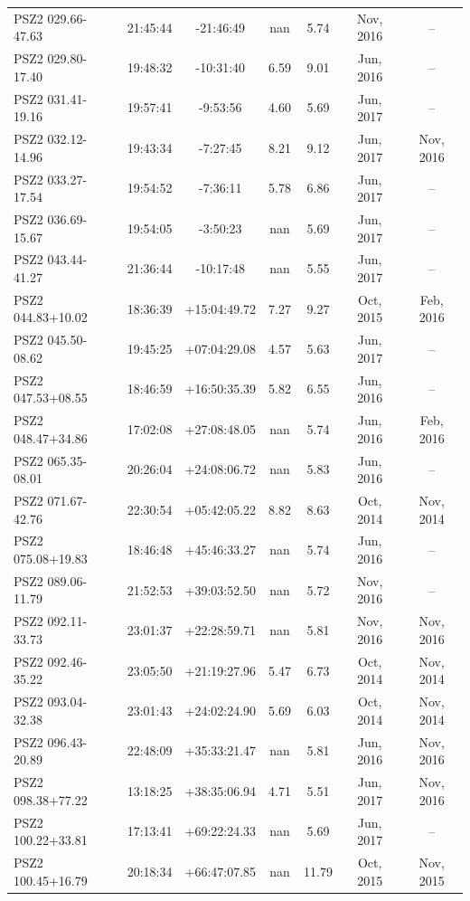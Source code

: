 \documentclass[apj, revtex4]{emulateapj}
\begin{document}
\begin{longtable*}{lcccccc}
PSZ2 029.66-47.63 & 21:45:44 & -21:46:49 & nan & 5.74 & Nov, 2016 & --\\
PSZ2 029.80-17.40 & 19:48:32 & -10:31:40 & 6.59 & 9.01 & Jun, 2016 & --\\
PSZ2 031.41-19.16 & 19:57:41 & -9:53:56 & 4.60 & 5.69 & Jun, 2017 & --\\
PSZ2 032.12-14.96 & 19:43:34 & -7:27:45 & 8.21 & 9.12 & Jun, 2017 & Nov, 2016\\
PSZ2 033.27-17.54 & 19:54:52 & -7:36:11 & 5.78 & 6.86 & Jun, 2017 & --\\
PSZ2 036.69-15.67 & 19:54:05 & -3:50:23 & nan & 5.69 & Jun, 2017 & --\\
PSZ2 043.44-41.27 & 21:36:44 & -10:17:48 & nan & 5.55 & Jun, 2017 & --\\
PSZ2 044.83+10.02 & 18:36:39 & +15:04:49.72 & 7.27 & 9.27 & Oct, 2015 & Feb, 2016\\
PSZ2 045.50-08.62 & 19:45:25 & +07:04:29.08 & 4.57 & 5.63 & Jun, 2017 & --\\
PSZ2 047.53+08.55 & 18:46:59 & +16:50:35.39 & 5.82 & 6.55 & Jun, 2016 & --\\
PSZ2 048.47+34.86 & 17:02:08 & +27:08:48.05 & nan & 5.74 & Jun, 2016 & Feb, 2016\\
PSZ2 065.35-08.01 & 20:26:04 & +24:08:06.72 & nan & 5.83 & Jun, 2016 & --\\
PSZ2 071.67-42.76 & 22:30:54 & +05:42:05.22 & 8.82 & 8.63 & Oct, 2014 & Nov, 2014\\
PSZ2 075.08+19.83 & 18:46:48 & +45:46:33.27 & nan & 5.74 & Jun, 2016 & --\\
PSZ2 089.06-11.79 & 21:52:53 & +39:03:52.50 & nan & 5.72 & Nov, 2016 & --\\
PSZ2 092.11-33.73 & 23:01:37 & +22:28:59.71 & nan & 5.81 & Nov, 2016 & Nov, 2016\\
PSZ2 092.46-35.22 & 23:05:50 & +21:19:27.96 & 5.47 & 6.73 & Oct, 2014 & Nov, 2014\\
PSZ2 093.04-32.38 & 23:01:43 & +24:02:24.90 & 5.69 & 6.03 & Oct, 2014 & Nov, 2014\\
PSZ2 096.43-20.89 & 22:48:09 & +35:33:21.47 & nan & 5.81 & Jun, 2016 & Nov, 2016\\
PSZ2 098.38+77.22 & 13:18:25 & +38:35:06.94 & 4.71 & 5.51 & Jun, 2017 & Nov, 2016\\
PSZ2 100.22+33.81 & 17:13:41 & +69:22:24.33 & nan & 5.69 & Jun, 2017 & --\\
PSZ2 100.45+16.79 & 20:18:34 & +66:47:07.85 & nan & 11.79 & Oct, 2015 & Nov, 2015\\

\end{longtable*}
\end{document}
